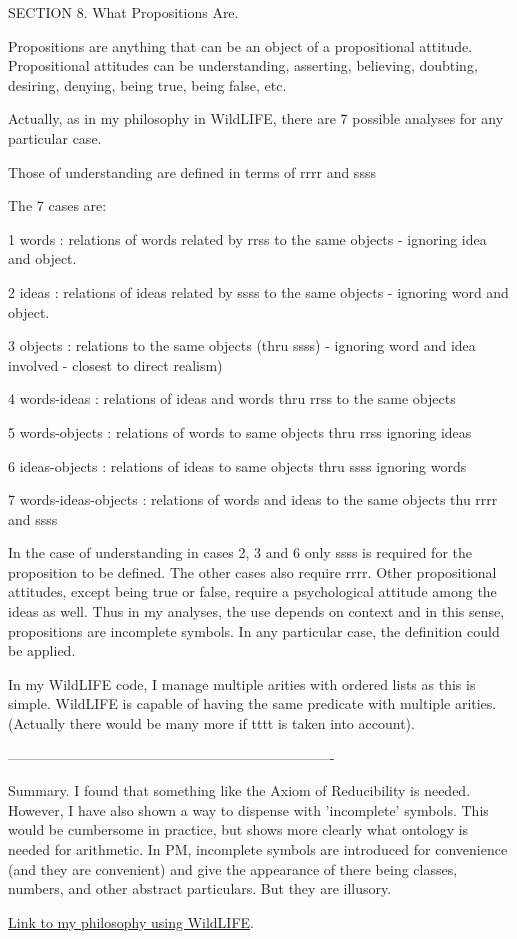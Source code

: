 \documentclass[12pt]{article}
\begin{document}
SECTION 8. What Propositions Are.

Propositions are anything that can be an object of a propositional attitude. Propositional attitudes can be understanding, asserting, believing, doubting, desiring, denying, being true, being false, etc.

Actually, as in my philosophy in WildLIFE, there are 7 possible analyses for any particular case.

Those of understanding are defined in terms of rrrr and ssss

The 7 cases are:

1 words : relations of words related by rrss to the same objects - ignoring idea and object.

2 ideas : relations of ideas related by ssss to the same objects - ignoring word and object.

3 objects : relations to the same objects (thru ssss) - ignoring word and idea involved - closest to direct realism)

4 words-ideas : relations of ideas and words thru rrss to the same objects

5 words-objects : relations of words to same objects thru rrss ignoring ideas

6 ideas-objects : relations of ideas to same objects thru ssss ignoring words

7 words-ideas-objects : relations of words and ideas to the same objects thu rrrr and ssss

In the case of understanding in cases 2, 3 and 6 only ssss is required for the proposition to be defined. The other cases also require rrrr. Other propositional attitudes, except being true or false, require a psychological attitude among the ideas as well. Thus in my analyses, the use depends on context and in this sense, propositions are incomplete symbols. In any particular case, the definition could be applied.

In my WildLIFE code, I manage multiple arities with ordered lists as this is simple. WildLIFE is capable of having the same predicate with multiple arities. 
(Actually there would be many more if tttt is taken into account).

----------------------------------------------------------------------

Summary. I found that something like the Axiom of Reducibility is needed. However, I have also shown a way to dispense with 'incomplete' symbols. This would be cumbersome in practice, but shows more clearly what ontology is needed for arithmetic. In PM, incomplete symbols are introduced for convenience (and they are convenient) and give the appearance of there being classes, numbers, and other abstract particulars. But they are illusory.

\href{https://dennisdarland.com/darland_philosophy/HTML/darland_philosophy.html}{Link to my philosophy using WildLIFE}.
\end{document}
